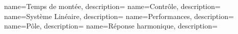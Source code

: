 %
{%
  name={Temps de montée},%
  description={
  }
}
%
{%
  name={Contrôle},%
  description={
  }
}
%
{%
  name={Système Linéaire},%
  description={
  }
}
%
{%
  name={Performances},%
  description={
  }
}
%
{%
  name={Pôle},%
  description={
  }
}
%
{%
  name={Réponse harmonique},%
  description={
  }
}
